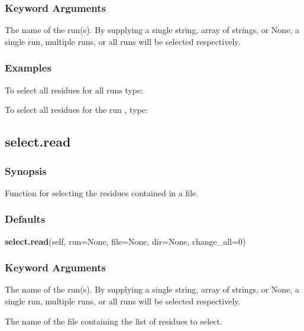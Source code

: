 \subsubsection{Keyword Arguments}


  The name of the run(s).  By supplying a single string, array of strings, or None, a single run, multiple runs, or all runs will be selected respectively.

\subsubsection{Examples}

To select all residues for all runs type:




To select all residues for the run 
, type:





\newpage

\subsection{select.read}


\subsubsection{Synopsis}

Function for selecting the residues contained in a file.

\subsubsection{Defaults}

\textsf{\textbf{select.read}(self, run=None, file=None, dir=None, change\_all=0)}


\subsubsection{Keyword Arguments}


  The name of the run(s).  By supplying a single string, array of strings, or None, a single run, multiple runs, or all runs will be selected respectively.

  The name of the file containing the list of residues to select.

